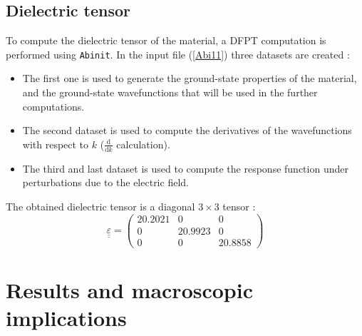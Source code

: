 \documentclass[11pt,a4paper]{article}
\begin{document}
\subsection{Dielectric tensor}
To compute the dielectric tensor of the material, a DFPT computation is performed using \texttt{Abinit}. In the input file (\autoref{Abi11}) three datasets are created : 
\begin{itemize}
\item The first one is used to generate the ground-state properties of the material, and the ground-state wavefunctions that will be used in the further computations.
\item The second dataset is used to compute the derivatives of the wavefunctions with respect to $k$ ($\frac{\text{d}}{\text{d}k}$ calculation).  
\item The third and last dataset is used to compute the response function under perturbations due to the electric field.
\end{itemize}
The obtained dielectric tensor is a diagonal $3\times 3$ tensor : 
\begin{equation}
\label{eqn:dielectricTens}\underline{\underline{\varepsilon}} = \left(\begin{array}{ccc}20.2021&0&0\\0&20.9923&0\\0&0&20.8858\end{array}\right)\end{equation}
\section{Results and macroscopic implications}
\end{document}
